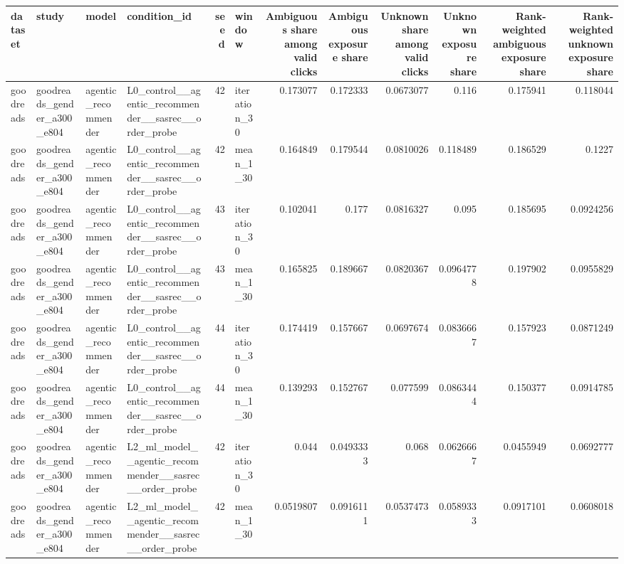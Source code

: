\begin{table}[htbp!]
\centering
\small
\setlength{\tabcolsep}{3pt}
\renewcommand{\arraystretch}{1.1}
\begin{tabular}{llllrlrrrrrr}
\hline
dataset & study & model & condition\_id & seed & window & Ambiguous share among valid clicks & Ambiguous exposure share & Unknown share among valid clicks & Unknown exposure share & Rank-weighted ambiguous exposure share & Rank-weighted unknown exposure share \\
\hline
goodreads & goodreads\_gender\_a300\_e804 & agentic\_recommender & L0\_control\_\_agentic\_recommender\_\_sasrec\_\_order\_probe & 42 & iteration\_30 & 0.173077 & 0.172333 & 0.0673077 & 0.116 & 0.175941 & 0.118044 \\
goodreads & goodreads\_gender\_a300\_e804 & agentic\_recommender & L0\_control\_\_agentic\_recommender\_\_sasrec\_\_order\_probe & 42 & mean\_1\_30 & 0.164849 & 0.179544 & 0.0810026 & 0.118489 & 0.186529 & 0.1227 \\
goodreads & goodreads\_gender\_a300\_e804 & agentic\_recommender & L0\_control\_\_agentic\_recommender\_\_sasrec\_\_order\_probe & 43 & iteration\_30 & 0.102041 & 0.177 & 0.0816327 & 0.095 & 0.185695 & 0.0924256 \\
goodreads & goodreads\_gender\_a300\_e804 & agentic\_recommender & L0\_control\_\_agentic\_recommender\_\_sasrec\_\_order\_probe & 43 & mean\_1\_30 & 0.165825 & 0.189667 & 0.0820367 & 0.0964778 & 0.197902 & 0.0955829 \\
goodreads & goodreads\_gender\_a300\_e804 & agentic\_recommender & L0\_control\_\_agentic\_recommender\_\_sasrec\_\_order\_probe & 44 & iteration\_30 & 0.174419 & 0.157667 & 0.0697674 & 0.0836667 & 0.157923 & 0.0871249 \\
goodreads & goodreads\_gender\_a300\_e804 & agentic\_recommender & L0\_control\_\_agentic\_recommender\_\_sasrec\_\_order\_probe & 44 & mean\_1\_30 & 0.139293 & 0.152767 & 0.077599 & 0.0863444 & 0.150377 & 0.0914785 \\
goodreads & goodreads\_gender\_a300\_e804 & agentic\_recommender & L2\_ml\_model\_\_agentic\_recommender\_\_sasrec\_\_order\_probe & 42 & iteration\_30 & 0.044 & 0.0493333 & 0.068 & 0.0626667 & 0.0455949 & 0.0692777 \\
goodreads & goodreads\_gender\_a300\_e804 & agentic\_recommender & L2\_ml\_model\_\_agentic\_recommender\_\_sasrec\_\_order\_probe & 42 & mean\_1\_30 & 0.0519807 & 0.0916111 & 0.0537473 & 0.0589333 & 0.0917101 & 0.0608018 \\

\end{tabular}
\end{table}
